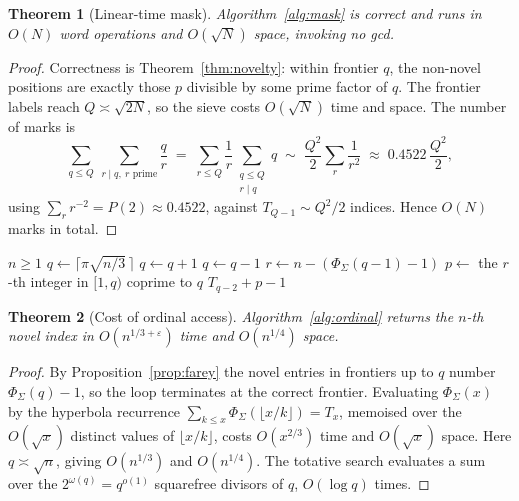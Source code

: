 \documentclass[11pt,a4paper]{article}
\theoremstyle{plain}
\newtheorem{theorem}{Theorem}[section]
\theoremstyle{definition}
\theoremstyle{remark}
\DeclareMathOperator{\rad}{rad}
\begin{document}
\begin{theorem}[Linear-time mask]\label{thm:masklinear}
Algorithm~\ref{alg:mask} is correct and runs in $O(N)$ word operations and
$O(\sqrt N)$ space, invoking no gcd.
\end{theorem}

\begin{proof}
Correctness is Theorem~\ref{thm:novelty}: within frontier $q$, the non-novel
positions are exactly those $p$ divisible by some prime factor of $q$. The
frontier labels reach $Q \asymp \sqrt{2N}$, so the sieve costs $O(\sqrt N)$ time
and space. The number of marks is
\[
  \sum_{q \le Q}\ \sum_{r \mid q,\ r \text{ prime}} \frac{q}{r}
  \;=\; \sum_{r \le Q} \frac1r \sum_{\substack{q \le Q\\ r \mid q}} q
  \;\sim\; \frac{Q^2}{2}\sum_{r} \frac{1}{r^2}
  \;\approx\; 0.4522\,\frac{Q^2}{2},
\]
using $\sum_r r^{-2} = P(2) \approx 0.4522$, against $T_{Q-1} \sim Q^2/2$
indices. Hence $O(N)$ marks in total.
\end{proof}

\begin{algorithm}[t]
\caption{Ordinal access: the $n$-th novel index}
\label{alg:ordinal}
\begin{algorithmic}[1]
\Require $n \ge 1$
\State $q \gets \lceil \pi\sqrt{n/3}\,\rceil$
 $q \gets q+1$ \EndWhile
{} $q \gets q-1$ \EndWhile
\State $r \gets n - (\Phi_\Sigma(q-1) - 1)$ 
\State $p \gets$ the $r$-th integer in $[1,q)$ coprime to $q$
  \Comment{binary search on $\sum_{d \mid \rad(q)} \mu(d)\lfloor x/d\rfloor$}
\State \Return $T_{q-2} + p - 1$
\end{algorithmic}
\end{algorithm}

\begin{theorem}[Cost of ordinal access]\label{thm:ordinal}
Algorithm~\ref{alg:ordinal} returns the $n$-th novel index in
$O(n^{1/3+\varepsilon})$ time and $O(n^{1/4})$ space.
\end{theorem}

\begin{proof}
By Proposition~\ref{prop:farey} the novel entries in frontiers up to $q$ number
$\Phi_\Sigma(q)-1$, so the loop terminates at the correct frontier. Evaluating
$\Phi_\Sigma(x)$ by the hyperbola recurrence
$\sum_{k \le x} \Phi_\Sigma(\lfloor x/k\rfloor) = T_x$, memoised over the
$O(\sqrt x)$ distinct values of $\lfloor x/k \rfloor$, costs $O(x^{2/3})$ time
and $O(\sqrt x)$ space. Here $q \asymp \sqrt n$, giving $O(n^{1/3})$ and
$O(n^{1/4})$. The totative search evaluates a sum over the $2^{\omega(q)}
= q^{o(1)}$ squarefree divisors of $q$, $O(\log q)$ times.
\end{proof}
\end{document}
